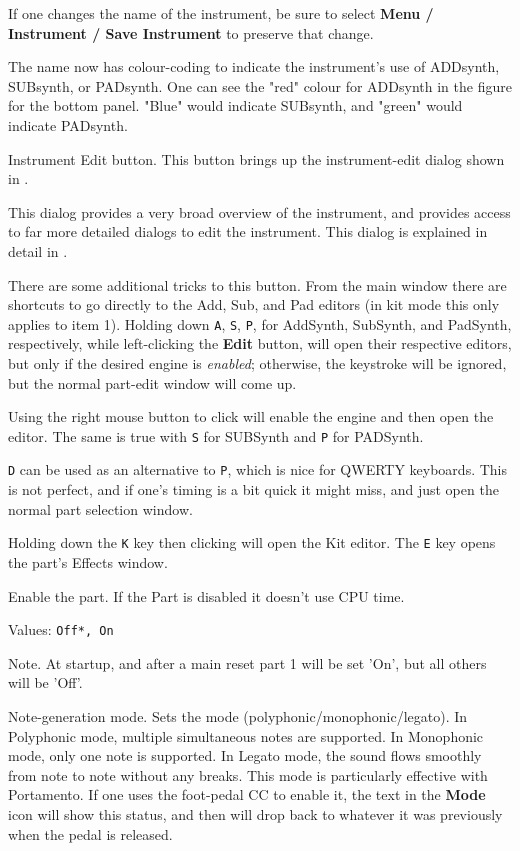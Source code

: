    If one changes the name of the instrument, be sure to select
   \textbf{Menu / Instrument / Save Instrument} to preserve that change.

   The name now has colour-coding to indicate the instrument's use of
   ADDsynth, SUBsynth, or PADsynth.  One can see the "red" colour for ADDsynth
   in the figure for the bottom panel.  "Blue" would indicate SUBsynth, and
   "green" would indicate PADsynth.

   Instrument Edit button.
   This button brings up the instrument-edit dialog shown in
   .

   This dialog provides a very broad overview of the instrument, and
   provides access to far more detailed dialogs to edit the instrument.
   This dialog is explained in detail in
   .

   There are some additional tricks to this button.
   From the main window there are shortcuts to go directly to the Add, Sub, and
   Pad editors (in kit mode this only applies to item 1).  Holding down
   \texttt{A},
   \texttt{S},
   \texttt{P}, for AddSynth, SubSynth, and PadSynth, respectively,
   while left-clicking the
   \textbf{Edit} button, will open their respective editors, but only if the
   desired engine is \textsl{enabled}; otherwise, the keystroke will be
   ignored, but the normal part-edit window will come up.

   Using the right mouse button to click will enable the engine and then open
   the editor.  The same is true with \texttt{S} for SUBSynth and \texttt{P}
   for PADSynth.

   \texttt{D} can be used as an alternative to
   \texttt{P}, which is nice for
   QWERTY keyboards.  This is not perfect, and if one's timing is a bit quick
   it might miss, and just open the normal part selection window.

   Holding down the \texttt{K} key then clicking will open
   the Kit editor.  The \texttt{E} key opens the part's Effects window.

   Enable the part. If the Part is disabled it doesn't use CPU time.

   Values: \texttt{Off*, On}

   Note. At startup, and after a main reset part 1 will be set 'On', but all
   others will be 'Off'.

   Note-generation mode.
   Sets the mode (polyphonic/monophonic/legato).
   In Polyphonic mode, multiple simultaneous notes are supported.
   In Monophonic mode, only one note is supported.
   In Legato mode, the sound flows smoothly from note to note without
   any breaks.  This mode is particularly effective with Portamento.
   If one uses the foot-pedal CC to enable it, the text in the
   \textbf{Mode} icon will show this status, and then will drop back to
   whatever it was previously when the pedal is released.

